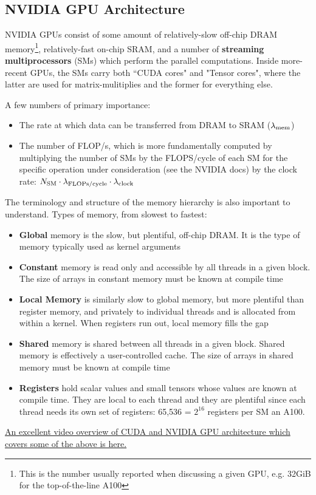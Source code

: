 \subsection{NVIDIA GPU Architecture}

NVIDIA GPUs consist of some amount of relatively-slow off-chip DRAM memory\footnote{This is the number usually reported when
	discussing a given GPU, e.g. 32GiB for the top-of-the-line A100}, relatively-fast on-chip SRAM, and
a number of \textbf{streaming multiprocessors} (SMs) which perform the parallel computations.  Inside
more-recent GPUs, the SMs carry both ``CUDA cores" and "Tensor cores", where the latter are used for matrix-mulitiplies
and the former for everything else.


A few numbers of primary importance:
\begin{itemize}
	\item The rate at which data can be transferred from DRAM to SRAM ($ \lambda _{ {\rm mem} } $)
	\item The number of FLOP/s, which is more fundamentally computed by multiplying the number of
	      SMs by the FLOPS/cycle of each SM for the specific operation under consideration (see the NVIDIA
	      docs) by the clock rate: $ N _{ {\rm SM} }\cdot  \lambda _{ {\rm FLOPs/cycle} }\cdot  \lambda _{
			      {\rm clock} } $
\end{itemize}

The terminology and structure of the memory hierarchy is also important to understand. Types of
memory, from slowest to fastest:
\begin{itemize}
	\item \textbf{Global} memory is the slow, but plentiful, off-chip DRAM. It is the type of memory
	      typically used as kernel arguments
	\item \textbf{Constant} memory is read only and accessible by all threads in a given block. The
	      size of arrays in constant memory must be known at compile time
	\item \textbf{Local Memory} is similarly slow to global memory, but more plentiful than register
	      memory, and privately to individual threads and is allocated from within a kernel. When
	      registers run out, local memory fills the gap
	\item \textbf{Shared} memory is shared between all threads in a given block. Shared memory is
	      effectively a user-controlled cache. The size of arrays in shared memory must  be known at
	      compile time
	\item \textbf{Registers} hold scalar values and small tensors whose values are known at compile
	      time. They are local to each thread and they are plentiful since each thread needs its own
	      set of registers: 65,536 = $ 2 ^{ 16 } $ registers per SM an A100.
\end{itemize}
\href{https://www.youtube.com/watch?v=QQceTDjA4f4&t=2124s}{An excellent video overview of CUDA and NVIDIA GPU architecture which covers some of the above is here.}

